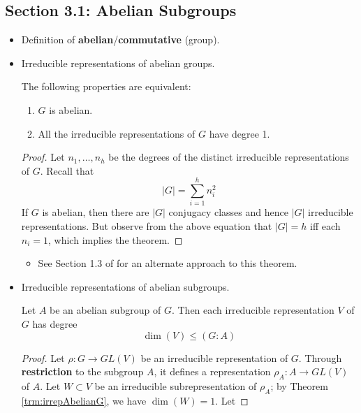 \documentclass[../notes.tex]{subfiles}
\begin{document}
\subsection*{Section 3.1: Abelian Subgroups}
\begin{itemize}
    \item {}Definition of \textbf{abelian}/\textbf{commutative} (group).
    \item Irreducible representations of abelian groups.
    \begin{theorem}\label{trm:irrepAbelianG}
        The following properties are equivalent:
        \begin{enumerate}[label={\textup{(\roman*)}}]
            \item $G$ is abelian.
            \item All the irreducible representations of $G$ have degree 1.
        \end{enumerate}
        \begin{proof}
            Let $n_1,\dots,n_h$ be the degrees of the distinct irreducible representations of $G$. Recall that
            \begin{equation*}
                |G| = \sum_{i=1}^hn_i^2
            \end{equation*}
            If $G$ is abelian, then there are $|G|$ conjugacy classes and hence $|G|$ irreducible representations. But observe from the above equation that $|G|=h$ iff each $n_i=1$, which implies the theorem.
        \end{proof}
    \end{theorem}
    \begin{itemize}
        \item See Section 1.3 of \textcite{bib:FultonHarris} for an alternate approach to this theorem.
    \end{itemize}
    \item Irreducible representations of abelian subgroups.
    \begin{corollary}
        Let $A$ be an abelian subgroup of $G$. Then each irreducible representation $V$ of $G$ has degree
        \begin{equation*}
            \dim(V) \leq (G:A)
        \end{equation*}
        \begin{proof}
            Let $\rho:G\to GL(V)$ be an irreducible representation of $G$. Through \textbf{restriction} to the subgroup $A$, it defines a representation $\rho_A:A\to GL(V)$ of $A$. Let $W\subset V$ be an irreducible subrepresentation of $\rho_A$; by Theorem \ref{trm:irrepAbelianG}, we have $\dim(W)=1$. Let

\end{proof}
\end{corollary}
\end{itemize}
\end{document}
